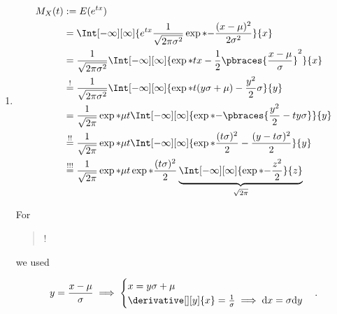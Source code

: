 \begin{solution}

\phantom{}

\begin{enumerate}[label = (\alph*)]

    \item

    \begin{align*}
        M_X(t)
        & :=
        E(e^{t x}) \\
        & =
        \Int[-\infty][\infty]
        {
            e^{t x}
            \frac{1}{\sqrt{2 \pi \sigma^2}}
            \exp*{-\frac{(x - \mu)^2}{2 \sigma^2}}
        }{x} \\
        & =
        \frac{1}{\sqrt{2 \pi \sigma^2}}
        \Int[-\infty][\infty]
        {
            \exp*
            {
                t x
                -
                \frac{1}{2} \pbraces{\frac{x - \mu}{\sigma}}^2
            }
        }{x} \\
        & \stackrel{!}{=}
        \frac{1}{\sqrt{2 \pi \sigma^2}}
        \Int[-\infty][\infty]
        {
            \exp*
            {
                t (y \sigma + \mu)
                -
                \frac{y^2}{2}
            }
            \sigma
        }{y} \\
        & =
        \frac{1}{\sqrt{2 \pi}}
        \exp*{\mu t}
        \Int[-\infty][\infty]
        {
            \exp*{-\pbraces{\frac{y^2}{2} - t y \sigma}}
        }{y} \\
        & \stackrel{!!}{=}
        \frac{1}{\sqrt{2 \pi}}
        \exp*{\mu t}
        \Int[-\infty][\infty]
        {
            \exp*
            {
                \frac{(t \sigma)^2}{2}
                -
                \frac{(y - t \sigma)^2}{2}
            }
        }{y} \\
        & \stackrel{!!!}{=}
        \frac{1}{\sqrt{2 \pi}}
        \exp*{\mu t}
        \exp*{\frac{(t \sigma)^2}{2}}
        \underbrace
        {
            \Int[-\infty][\infty]
            {
                \exp*{-\frac{z^2}{2}}
            }{z}
        }_{
            \sqrt{2 \pi}
        }
        \end{align*}

        For \blockquote{!} we used

        \begin{align*}
            y = \frac{x - \mu}{\sigma}
            \implies
            \begin{cases}
                x = y \sigma + \mu \\
                \derivative[][y]{x} = \frac{1}{\sigma} \implies \mathrm d x = \sigma \mathrm d y
            \end{cases}.
        \end{align*}


\end{enumerate}
\end{solution}
